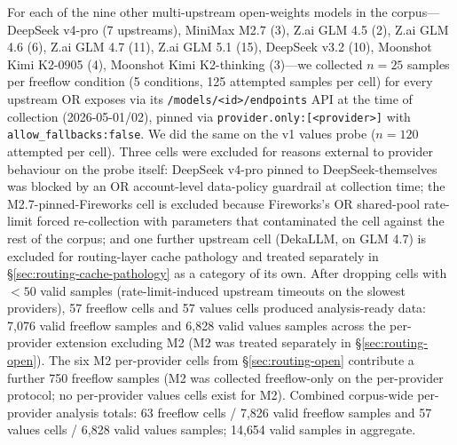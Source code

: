 \documentclass[11pt,a4paper]{article}
\begin{document}
For each of the nine other multi-upstream open-weights models in the corpus---DeepSeek v4-pro (7 upstreams), MiniMax M2.7 (3), Z.ai GLM 4.5 (2), Z.ai GLM 4.6 (6), Z.ai GLM 4.7 (11), Z.ai GLM 5.1 (15), DeepSeek v3.2 (10), Moonshot Kimi K2-0905 (4), Moonshot Kimi K2-thinking (3)---we collected $n{=}25$ samples per freeflow condition (5 conditions, 125 attempted samples per cell) for every upstream OR exposes via its \texttt{/models/<id>/endpoints} API at the time of collection (2026-05-01/02), pinned via \texttt{provider.only:[<provider>]} with \texttt{allow\_fallbacks:false}. We did the same on the v1 values probe ($n{=}120$ attempted per cell). Three cells were excluded for reasons external to provider behaviour on the probe itself: DeepSeek v4-pro pinned to DeepSeek-themselves was blocked by an OR account-level data-policy guardrail at collection time; the M2.7-pinned-Fireworks cell is excluded because Fireworks's OR shared-pool rate-limit forced re-collection with parameters that contaminated the cell against the rest of the corpus; and one further upstream cell (DekaLLM, on GLM 4.7) is excluded for routing-layer cache pathology and treated separately in \S\ref{sec:routing-cache-pathology} as a category of its own. After dropping cells with $<50$ valid samples (rate-limit-induced upstream timeouts on the slowest providers), 57 freeflow cells and 57 values cells produced analysis-ready data: 7{,}076 valid freeflow samples and 6{,}828 valid values samples across the per-provider extension excluding M2 (M2 was treated separately in \S\ref{sec:routing-open}). The six M2 per-provider cells from \S\ref{sec:routing-open} contribute a further 750 freeflow samples (M2 was collected freeflow-only on the per-provider protocol; no per-provider values cells exist for M2). Combined corpus-wide per-provider analysis totals: 63 freeflow cells / 7{,}826 valid freeflow samples and 57 values cells / 6{,}828 valid values samples; 14{,}654 valid samples in aggregate.
\end{document}
